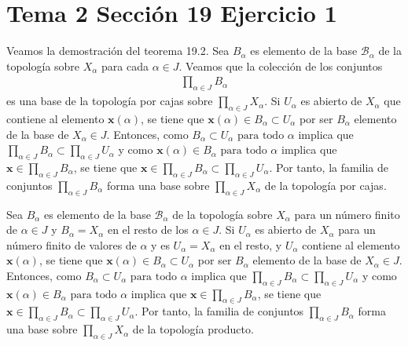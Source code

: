\documentclass{article}
\newcommand{\vect}[1]{\boldsymbol{#1}}
\begin{document}
\section{Tema 2 Sección 19 Ejercicio 1}
Veamos la demostración del teorema 19.2. Sea $B_\alpha$ es elemento de la base $\mathcal{B}_\alpha$ de la topología sobre $X_\alpha$ para cada $\alpha\in J$. Veamos que la colección de los conjuntos
\begin{eqnarray}
\prod_{\alpha\in J} B_\alpha\nonumber
\end{eqnarray}
es una base de la topología por cajas sobre $\prod_{\alpha\in J} X_\alpha$. Si $U_\alpha$ es abierto de $X_\alpha$ que contiene al elemento $\vect{x}(\alpha)$, se tiene que $\vect{x}(\alpha)\in B_\alpha\subset U_\alpha$ por ser $B_\alpha$ elemento de la base de $X_\alpha\in J$. Entonces, como $B_\alpha\subset U_\alpha \text{ para todo }\alpha$ implica que $\prod_{\alpha\in J} B_\alpha\subset \prod_{\alpha\in J} U_\alpha$ y como $\vect{x}(\alpha)\in B_\alpha \text{ para todo }\alpha$ implica que $ \vect{x}\in\prod_{\alpha\in J} B_\alpha$, se tiene que $\vect{x}\in\prod_{\alpha\in J} B_\alpha\subset \prod_{\alpha\in J} U_\alpha$. Por tanto, la familia de conjuntos $\prod_{\alpha\in J} B_\alpha$ forma una base sobre $\prod_{\alpha\in J} X_\alpha$ de la topología por cajas.

Sea $B_\alpha$ es elemento de la base $\mathcal{B}_\alpha$ de la topología sobre $X_\alpha$ para un número finito de $\alpha\in J$ y $B_\alpha=X_\alpha$ en el resto de los $\alpha\in J$. Si $U_\alpha$ es abierto de $X_\alpha$ para un número finito de valores de $\alpha$ y es $U_\alpha=X_\alpha$ en el resto, y $U_\alpha$ contiene al elemento $\vect{x}(\alpha)$, se tiene que $\vect{x}(\alpha)\in B_\alpha\subset U_\alpha$ por ser $B_\alpha$ elemento de la base de $X_\alpha\in J$. Entonces, como $B_\alpha\subset U_\alpha \text{ para todo }\alpha$ implica que $\prod_{\alpha\in J} B_\alpha\subset \prod_{\alpha\in J} U_\alpha$ y como $\vect{x}(\alpha)\in B_\alpha \text{ para todo }\alpha$ implica que $ \vect{x}\in\prod_{\alpha\in J} B_\alpha$, se tiene que $\vect{x}\in\prod_{\alpha\in J} B_\alpha\subset \prod_{\alpha\in J} U_\alpha$. Por tanto, la familia de conjuntos $\prod_{\alpha\in J} B_\alpha$ forma una base sobre $\prod_{\alpha\in J} X_\alpha$ de la topología producto.
\end{document}
